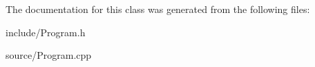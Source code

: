 The documentation for this class was generated from the following files\+:\begin{DoxyCompactItemize}
\item 
include/Program.\+h\item 
source/Program.\+cpp\end{DoxyCompactItemize}
